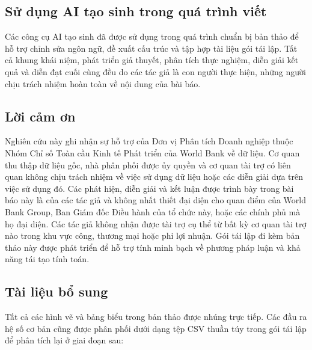 \documentclass[12pt,a4paper]{article}
\begin{document}
\hypertarget{sux1eed-dux1ee5ng-ai-tux1ea1o-sinh-trong-quuxe1-truxecnh-viux1ebft}{%
\subsection{Sử dụng AI tạo sinh trong quá trình
viết}\label{sux1eed-dux1ee5ng-ai-tux1ea1o-sinh-trong-quuxe1-truxecnh-viux1ebft}}

Các công cụ AI tạo sinh đã được sử dụng trong quá trình chuẩn bị bản
thảo để hỗ trợ chỉnh sửa ngôn ngữ, đề xuất cấu trúc và tập hợp tài liệu
gói tái lập. Tất cả khung khái niệm, phát triển giả thuyết, phân tích
thực nghiệm, diễn giải kết quả và diễn đạt cuối cùng đều do các tác giả
là con người thực hiện, những người chịu trách nhiệm hoàn toàn về nội
dung của bài báo.

\hypertarget{lux1eddi-cux1ea3m-ux1a1n}{%
\subsection{Lời cảm ơn}\label{lux1eddi-cux1ea3m-ux1a1n}}

Nghiên cứu này ghi nhận sự hỗ trợ của Đơn vị Phân tích Doanh nghiệp
thuộc Nhóm Chỉ số Toàn cầu Kinh tế Phát triển của World Bank về dữ liệu.
Cơ quan thu thập dữ liệu gốc, nhà phân phối được ủy quyền và cơ quan tài
trợ có liên quan không chịu trách nhiệm về việc sử dụng dữ liệu hoặc các
diễn giải dựa trên việc sử dụng đó. Các phát hiện, diễn giải và kết luận
được trình bày trong bài báo này là của các tác giả và không nhất thiết
đại diện cho quan điểm của World Bank Group, Ban Giám đốc Điều hành của
tổ chức này, hoặc các chính phủ mà họ đại diện. Các tác giả không nhận
được tài trợ cụ thể từ bất kỳ cơ quan tài trợ nào trong khu vực công,
thương mại hoặc phi lợi nhuận. Gói tái lập đi kèm bản thảo này được phát
triển để hỗ trợ tính minh bạch về phương pháp luận và khả năng tái tạo
tính toán.

\hypertarget{tuxe0i-liux1ec7u-bux1ed5-sung}{%
\subsection{Tài liệu bổ sung}\label{tuxe0i-liux1ec7u-bux1ed5-sung}}

Tất cả các hình vẽ và bảng biểu trong bản thảo được nhúng trực tiếp. Các
đầu ra hệ số cơ bản cũng được phân phối dưới dạng tệp CSV thuần túy
trong gói tái lập để phân tích lại ở giai đoạn sau:
\end{document}
